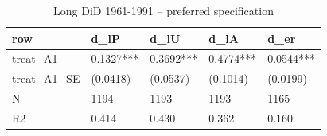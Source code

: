\begin{table}

\caption{Long DiD 1961-1991 -- preferred specification}
\centering
\begin{tabular}[t]{lllll}
\toprule
row & d\_lP & d\_lU & d\_lA & d\_er\\
\midrule
treat\_A1 & 0.1327*** & 0.3692*** & 0.4774*** & 0.0544***\\
treat\_A1\_SE & (0.0418) & (0.0537) & (0.1014) & (0.0199)\\
N & 1194 & 1193 & 1193 & 1165\\
R2 & 0.414 & 0.430 & 0.362 & 0.160\\
\bottomrule
\end{tabular}
\end{table}
